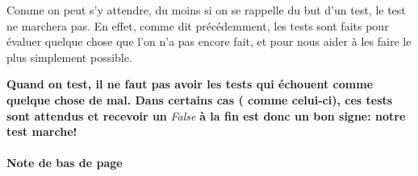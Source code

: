 \documentclass[letterpaper,10pt,french]{sphinxmanual}
\begin{document}
Comme on peut s'y attendre, du moins si on se rappelle du but d'un test, le test ne marchera pas. En effet, comme dit précédemment,
les tests sont faits pour évaluer quelque chose que l'on n'a pas encore fait, et pour nous aider à les faire le plus simplement possible.

\textbf{Quand on test, il ne faut pas avoir les tests qui échouent comme quelque chose de mal. Dans certains cas ( comme celui-ci),
ces tests sont attendus et recevoir un} \emph{False} \textbf{à la fin est donc un bon signe: notre test marche!}
\paragraph{Note de bas de page}



\renewcommand{\indexname}{Index}
\printindex
\end{document}
